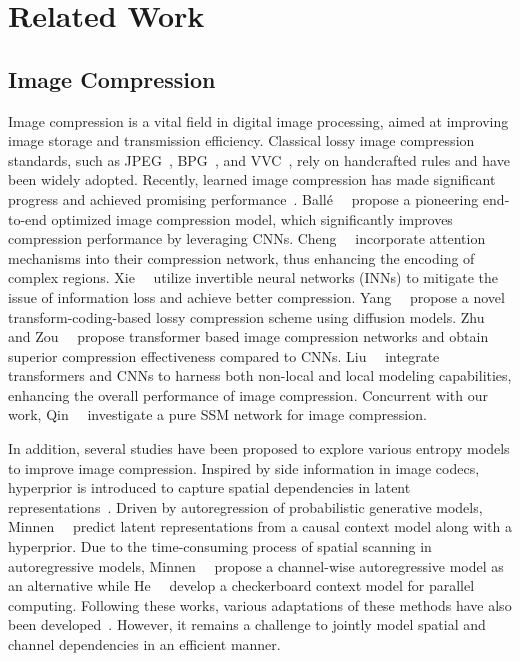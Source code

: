\section{Related Work}
\subsection{Image Compression}


Image compression is a vital field in digital image processing, aimed at improving image storage and transmission efficiency.
Classical lossy image compression standards, such as JPEG~\cite{wallace1991jpeg}, BPG~\cite{bellard2018bpg}, and VVC~\cite{bross2020versatile}, rely on handcrafted rules and have been widely adopted.
Recently, learned image compression has made significant progress and achieved promising performance~\cite{balle2017end, song2021variable, rhee2022lc, lee2022dpict, cui2021asymmetric, ma2022end, ali2023towards, fu2023learned}.
Ball\'e~\etal~\cite{balle2017end} propose a pioneering end-to-end optimized image compression model, which significantly improves compression performance by leveraging CNNs.
Cheng~\etal~\cite{cheng2020learned} incorporate attention mechanisms into their compression network, thus enhancing the encoding of complex regions.
Xie~\etal~\cite{xie2021enhanced} utilize invertible neural networks (INNs) to mitigate the issue of information loss and achieve better compression.
Yang~\etal~\cite{yang2024lossy} propose a novel transform-coding-based lossy compression scheme using diffusion models.
Zhu~\etal~\cite{zhu2022transformer} and Zou~\etal~\cite{zou2022devil} propose transformer based image compression networks and obtain superior compression effectiveness compared to CNNs.
Liu~\etal~\cite{liu2023learned} integrate transformers and CNNs to harness both non-local and local modeling capabilities, enhancing the overall performance of image compression. Concurrent with our work, Qin~\etal~\cite{qin2024mambavc} investigate a pure SSM network for image compression.


In addition, several studies have been proposed to explore various entropy models to improve image compression.
Inspired by side information in image codecs, hyperprior is introduced to capture spatial dependencies in latent representations~\cite{balle2018variational}.
Driven by autoregression of probabilistic generative models, Minnen~\etal~\cite{minnen2018joint} predict latent representations from a causal context model along with a hyperprior.
Due to the time-consuming process of spatial scanning in autoregressive models, Minnen~\etal~\cite{minnen2020channel} propose a channel-wise autoregressive model as an alternative while He~\etal~\cite{he2021checkerboard} develop a checkerboard context model for parallel computing. 
Following these works, various adaptations of these methods have also been developed~\cite{he2022elic, jiang2023mlic, koyuncu2024efficient}. 
However, it remains a challenge to jointly model spatial and channel dependencies in an efficient manner.


